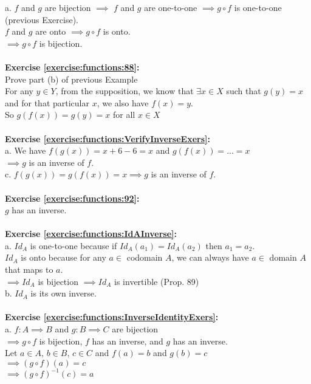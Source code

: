 a. $f$ and $g$ are bijection $\implies$  $f$ and $g$ are one-to-one $\implies g\circ f$ is one-to-one (previous Exercise).\\
$f$ and $g$ are onto $\implies g\circ f$ is onto.\\
$\implies g\circ f$ is bijection.\\
\\
\textbf{Exercise \ref{exercise:functions:88}:}\\
Prove part (b) of previous Example\\
For any $y\in Y$, from the supposition, we know that $\exists x\in X$ such that $g(y)=x$ and for that particular $x$, we also have $f(x)=y$.\\
So $g(f(x))=g(y)=x$ for all $x\in X$\\
\\
\textbf{Exercise \ref{exercise:functions:VerifyInverseExers}:}\\
a. We have $f(g(x))=x+6-6=x$ and $g(f(x))=...=x$\\
$\implies g$ is an inverse of $f$.\\
c. $f(g(x))=g(f(x))=x \implies g$ is an inverse of $f$.\\
\\
\textbf{Exercise \ref{exercise:functions:92}:}\\
$g$ has an inverse.\\
\\
\textbf{Exercise \ref{exercise:functions:IdAInverse}:}\\
a. $Id_A$ is one-to-one because if $Id_A(a_1)=Id_A(a_2)$ then $a_1=a_2$.\\
$Id_A$ is onto because for any $a\in$ codomain $A$, we can always have $a\in$ domain $A$ that maps to $a$.\\
$\implies Id_A$ is bijection $\implies Id_A$ is invertible (Prop. 89)\\
b. $Id_A$ is its own inverse.\\
\\
\textbf{Exercise \ref{exercise:functions:InverseIdentityExers}:}\\
a. $f: A\implies B$ and $g: B\implies C$ are bijection\\
$\implies g\circ f$ is bijection, $f$ has an inverse, and $g$ has an inverse.\\
Let $a\in A$, $b\in B$, $c\in C$ and $f(a)=b$ and $g(b)=c$\\
$\implies (g\circ f)(a)=c$\\
$\implies (g\circ f)^{-1}(c)=a$\\
